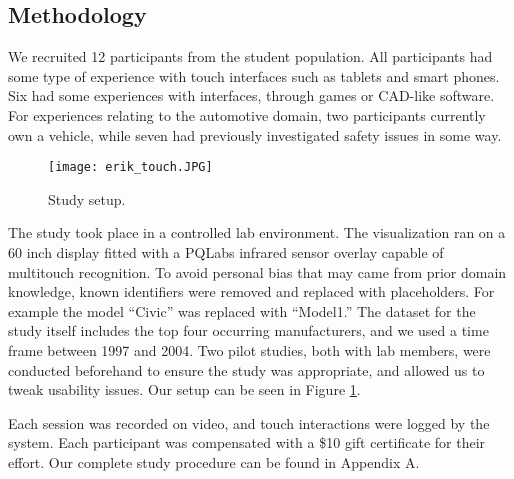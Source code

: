 

\subsection{Methodology}
We recruited 12 participants from the student population. All participants had some
type of experience with touch interfaces such as tablets and smart phones. Six 
had some experiences with \threed interfaces, through games or CAD-like
software. For experiences relating to the automotive domain, two participants
currently own a vehicle, while seven had previously investigated safety issues in
some way. 
 
	\begin{figure}
	 \centering  
	 \texttt{[image: erik\_touch.JPG]}  
	 \caption{Study setup.}
	 \label{figure:study}
	\end{figure}


The study took place in a controlled lab environment. The visualization ran on
a 60 inch display fitted with a PQLabs infrared sensor overlay capable of
multitouch recognition. To avoid personal bias that may came from prior domain
knowledge, known identifiers were removed and replaced with placeholders.
For example the model ``Civic'' was replaced with ``Model1.'' The dataset for
the study itself includes the top four occurring manufacturers, and we used a time
frame between 1997 and 2004. Two pilot studies, both with lab members, were
conducted beforehand to ensure the study was appropriate, and allowed us to
tweak usability issues. Our setup can be seen in Figure \ref{figure:study}.

Each session was recorded on video, and touch interactions were
logged by the system. Each participant was compensated with a \$10 gift
certificate for their effort. Our complete study procedure can be found in Appendix A.


